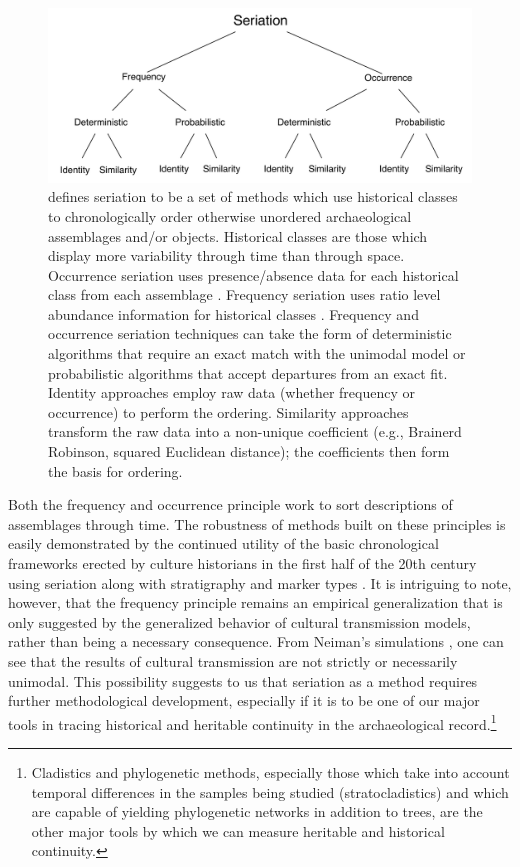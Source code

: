 \documentclass[graybox,natbib]{svmult}
\begin{document}
\begin{figure}[ht]
\centering
\includegraphics[scale=0.6]{seriation-methods.pdf}
\caption{\citet{Dunnell1981} defines seriation to be a set of methods which use historical classes to chronologically order otherwise unordered archaeological assemblages and/or objects. Historical classes are those which display more variability through time than through space. Occurrence seriation uses presence/absence data for each historical class from each assemblage \citep{Kroeber1916,Petrie:1899aa}. Frequency seriation uses ratio level abundance information for historical classes \citep{Spier1917,Ford:1935aa,Ford:1962aa}. Frequency and occurrence seriation techniques can take the form of deterministic algorithms that require an exact match with the unimodal model or probabilistic algorithms that accept departures from an exact fit. Identity approaches employ raw data (whether frequency or occurrence) to perform the ordering. Similarity approaches transform the raw data into a non-unique coefficient (e.g., Brainerd Robinson, squared Euclidean distance); the coefficients then form the basis for ordering.}
\label{img:seriation-methods}
\end{figure}

Both the frequency and occurrence principle work to sort descriptions of
assemblages through time. The robustness of methods built on these
principles is easily demonstrated by the continued utility of the basic
chronological frameworks erected by culture historians in the first half
of the 20th century using seriation along with stratigraphy and marker
types \citep{lyman1997rise}. It is intriguing to note, however, that the
frequency principle remains an empirical generalization that is only
suggested by the generalized behavior of cultural transmission models,
rather than being a necessary consequence. From Neiman's simulations
\citep[i.e.,][]{Neiman1995}, one can see that the results of cultural
transmission are not strictly or necessarily unimodal. This possibility
suggests to us that seriation as a method requires further
methodological development, especially if it is to be one of our major
tools in tracing historical and heritable continuity in the
archaeological record.\footnote{Cladistics and phylogenetic methods,
  especially those which take into account temporal differences in the
  samples being studied (stratocladistics) and which are capable of
  yielding phylogenetic networks in addition to trees, are the other
  major tools by which we can measure heritable and historical
  continuity.}
\end{document}
